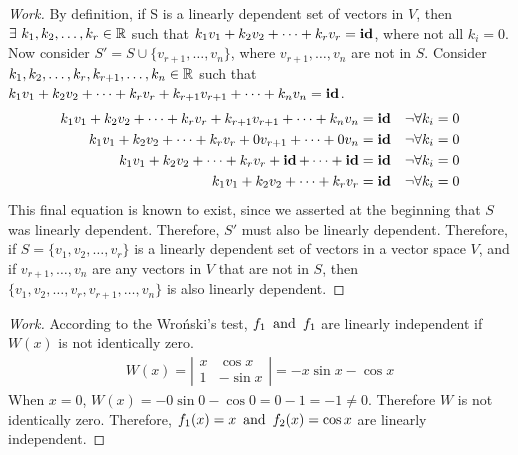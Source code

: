 \documentclass{article}
\begin{document}
\begin{proof}[Work]
  By definition, if S is a linearly dependent set of vectors in $V$, then $\exists~ k_1,k_2,\ldots,k_r \in \mathbb{R}$ such that $k_1v_1 + k_2v_2 + \cdots + k_rv_r = \operatorname{\textbf{id}}$, where not all $k_i = 0$. Now consider $S' = S \cup \{v_{r+1},\ldots,v_n\}$, where $v_{r+1},\ldots,v_n$ are not in $S$. Consider $k_1,k_2,\ldots,k_r,k_{r+1},\ldots,k_n \in \mathbb{R}$ such that $k_1v_1 + k_2v_2 + \cdots + k_rv_r + k_{r+1}v_{r+1} + \cdots + k_nv_n = \operatorname{\textbf{id}}$.
  \begin{align*}
    k_1v_1 + k_2v_2 + \cdots + k_rv_r + k_{r+1}v_{r+1} + \cdots + k_nv_n & = \operatorname{\textbf{id}} &  & \lnot \forall k_i = 0 \\
    k_1v_1 + k_2v_2 + \cdots + k_rv_r + 0v_{r+1} + \cdots + 0v_n         & = \operatorname{\textbf{id}} &  & \lnot \forall k_i = 0 \\
    k_1v_1 + k_2v_2 + \cdots + k_rv_r + \operatorname{\textbf{id}} + \cdots + \operatorname{\textbf{id}}               & = \operatorname{\textbf{id}} &  & \lnot \forall k_i = 0 \\
    k_1v_1 + k_2v_2 + \cdots + k_rv_r                                    & = \operatorname{\textbf{id}} &  & \lnot \forall k_i = 0 \\
  \end{align*}
  This final equation is known to exist, since we asserted at the beginning that $S$ was linearly dependent. Therefore, $S'$ must also be linearly dependent. Therefore, if $S = \{v_1,v_2,\ldots,v_r\}$ is a linearly dependent set of vectors in a vector space $V$, and if $v_{r+1},\ldots,v_n$ are any vectors in $V$ that are not in $S$, then $\{v_1,v_2,\ldots,v_r,v_{r+1},\ldots,v_n\}$ is also linearly dependent.
\end{proof}
\qdash

\begin{proof}[Work]
  According to the Wroński's test, $f_1 \operatorname{~\text{and}~} f_1$ are linearly independent if $W(x)$ is not identically zero.
  \begin{align*}
    W(x) = \left\lvert \begin{array}{cc}
                         x & \cos x  \\
                         1 & -\sin x
                       \end{array}\right\rvert = -x\sin x - \cos x
  \end{align*}
  When $x = 0$, $W(x) = -0\sin 0 - \cos 0 = 0 - 1 = -1 \neq 0$. Therefore $W$ is not identically zero. Therefore, $f_1(x) = x \operatorname{~\text{and}~} f_2(x) = \cos x$ are linearly independent.
\end{proof}
\qdash
\end{document}
